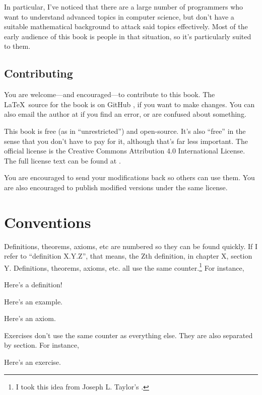 In particular, I've noticed that there are a large number of
programmers who want to understand advanced topics in computer
science, but don't have a suitable mathematical background to attack
said topics effectively. Most of the early audience of this book is
people in that situation, so it's particularly suited to them.

\subsection{Contributing}

You are welcome---and encouraged---to contribute to this book. The
\LaTeX\ source for the book is on GitHub
, if you want to
make changes. You can also email the author at
 if you find an error, or are
confused about something.

This book is free (as in ``unrestricted'') and open-source. It's also
``free'' in the sense that you don't have to pay for it, although
that's far less important.  The official license is the Creative
Commons Attribution 4.0 International License. The full license text
can be found at
.

You are encouraged to send your modifications back so others can use
them. You are also encouraged to publish modified versions under the
same license.

\section{Conventions}

Definitions, theorems, axioms, etc are numbered so they can be found
quickly. If I refer to ``definition X.Y.Z'', that means, the Zth
definition, in chapter X, section Y. Definitions, theorems, axioms,
etc. all use the same counter.\footnote{I took this idea from Joseph
  L. Taylor's .} For instance,

\begin{definition}
  Here's a definition!
\end{definition}

\begin{example}
  Here's an example.
\end{example}

\begin{axiom}
  Here's an axiom.
\end{axiom}

Exercises don't use the same counter as everything else. They are also
separated by section. For instance,

\begin{exercise}
  Here's an exercise.
\end{exercise}